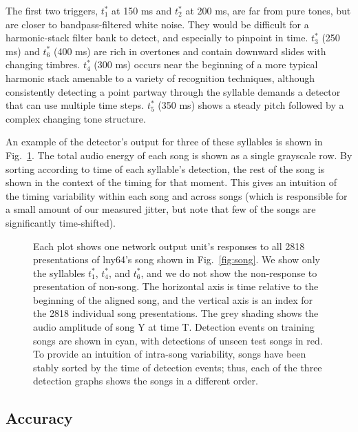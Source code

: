 \documentclass[10pt,letterpaper]{article}
\newcommand\fig[1]{Fig.~\ref{#1}}
\begin{document}
The first two triggers, $t^*_1$ at 150 ms and $t^*_2$ at 200 ms, are
far from pure tones, but are closer to bandpass-filtered white noise.  They would be
difficult for a harmonic-stack filter bank to detect, and especially
to pinpoint in time.  $t^*_3$ (250 ms) and $t^*_6$ (400 ms) are rich
in overtones and contain downward slides with changing timbres.
$t^*_4$ (300 ms) occurs near the beginning of a more typical harmonic
stack amenable to a variety of recognition techniques, although
consistently detecting a point partway through the syllable demands a
detector that can use multiple time steps.  $t^*_5$ (350 ms) shows a
steady pitch followed by a complex changing tone structure.

An example of the detector's output for three of these syllables is
shown in \fig{fig:detection_raster}.  The total audio energy of each
song is shown as a single grayscale row.  By sorting according to time
of each syllable's detection, the rest of the song is shown in the
context of the timing for that moment.  This gives an intuition of the
timing variability within each song and across songs (which is
responsible for a small amount of our measured jitter, but note that few of the songs are significantly time-shifted).

\begin{figure}
  \caption{Each plot shows one network output unit's responses to all
    2818 presentations of lny64's song shown in \fig{fig:song}.  We
    show only the syllables $t^*_1$, $t^*_4$, and $t^*_6$, and we do
    not show the non-response to presentation of non-song. The
    horizontal axis is time relative to the beginning of the aligned
    song, and the vertical axis is an index for the 2818 individual
    song presentations. The grey shading shows the audio amplitude of
    song Y at time T. Detection events on training songs are shown in
    cyan, with detections of unseen test songs in red.  To provide an
    intuition of intra-song variability, songs have been stably sorted
    by the time of detection events; thus, each of the three detection
    graphs shows the songs in a different order.}
  \label{fig:detection_raster}
\end{figure}

\subsection{Accuracy}
\end{document}
